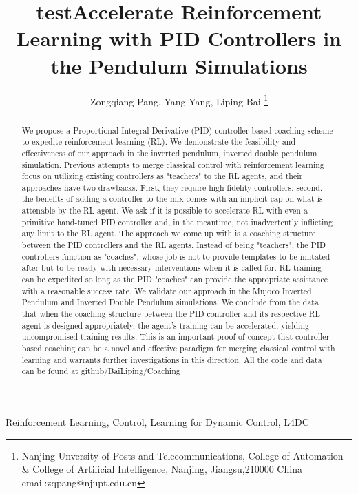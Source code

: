 \documentclass[journal]{IEEEtran}
\begin{document}
    \title{test}
\title{Accelerate Reinforcement Learning with PID Controllers in the Pendulum Simulations}

\author{ Zongqiang Pang, Yang Yang, Liping Bai \thanks{Nanjing Unversity of Posts and Telecommunications, College of Automation \& College of Artificial Intelligence, Nanjing, Jiangsu,210000 China email:zqpang@njupt.edu.cn}}
\maketitle
\begin{abstract}
We propose a Proportional Integral Derivative (PID) controller-based coaching scheme to expedite reinforcement learning (RL). We demonstrate the feasibility and effectiveness of our approach in the inverted pendulum, inverted double pendulum simulation. Previous attempts to merge classical control with reinforcement learning focus on utilizing existing controllers as "teachers" to the RL agents, and their approaches have two drawbacks. First, they require high fidelity controllers; second, the benefits of adding a controller to the mix comes with an implicit cap on what is attenable by the RL agent. We ask if it is possible to accelerate RL with even a primitive hand-tuned PID controller and, in the meantime, not inadvertently inflicting any limit to the RL agent. The approach we come up with is a coaching structure between the PID controllers and the RL agents. Instead of being "teachers", the PID controllers function as "coaches", whose job is not to provide templates to be imitated after but to be ready with necessary interventions when it is called for. RL training can be expedited so long as the PID "coaches" can provide the appropriate assistance with a reasonable success rate. We validate our approach in the Mujoco Inverted Pendulum and Inverted Double Pendulum simulations. We conclude from the data that when the coaching structure between the PID controller and its respective RL agent is designed appropriately, the agent's training can be accelerated, yielding uncompromised training results. This is an important proof of concept that controller-based coaching can be a novel and effective paradigm for merging classical control with learning and warrants further investigations in this direction. All the code and data can be found at \href{https://github.com/BaiLiping/Coaching}{github/BaiLiping/Coaching}

\end{abstract}
\begin{IEEEkeywords}
Reinforcement Learning, Control, Learning for Dynamic Control, L4DC
\end{IEEEkeywords}
\IEEEpeerreviewmaketitle
\end{document}
